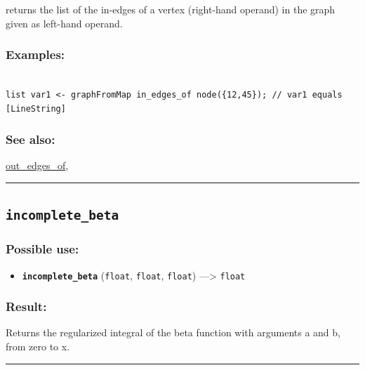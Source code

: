 \documentclass[]{book}
\providecommand{\tightlist}{%
  \setlength{\itemsep}{0pt}\setlength{\parskip}{0pt}}
\theoremstyle{definition}
\theoremstyle{definition}
\theoremstyle{definition}
\theoremstyle{remark}
\begin{document}
returns the list of the in-edges of a vertex (right-hand operand) in the
graph given as left-hand operand.

\subsubsection{Examples:}\label{examples-206}

\begin{verbatim}
 
list var1 <- graphFromMap in_edges_of node({12,45}); // var1 equals [LineString]
\end{verbatim}

\subsubsection{See also:}\label{see-also-116}

\href{operators-n-to-r.html\#out_edges_of}{out\_edges\_of},

\begin{center}\rule{0.5\linewidth}{\linethickness}\end{center}

\subsection{\texorpdfstring{\texttt{incomplete\_beta}}{incomplete\_beta}}\label{incomplete_beta}

\subsubsection{Possible use:}\label{possible-use-269}

\begin{itemize}
\tightlist
\item
  \textbf{\texttt{incomplete\_beta}} (\texttt{float}, \texttt{float},
  \texttt{float}) ---\textgreater{} \texttt{float}
\end{itemize}

\subsubsection{Result:}\label{result-259}

Returns the regularized integral of the beta function with arguments a
and b, from zero to x.

\begin{center}\rule{0.5\linewidth}{\linethickness}\end{center}
\end{document}
